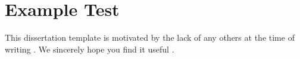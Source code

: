 \section{Example Test}

This dissertation template is motivated by the lack of any others at the time of writing \cite{jefferson2019policing}.
We sincerely hope you find it useful \cite{shannon1948mathematical}.